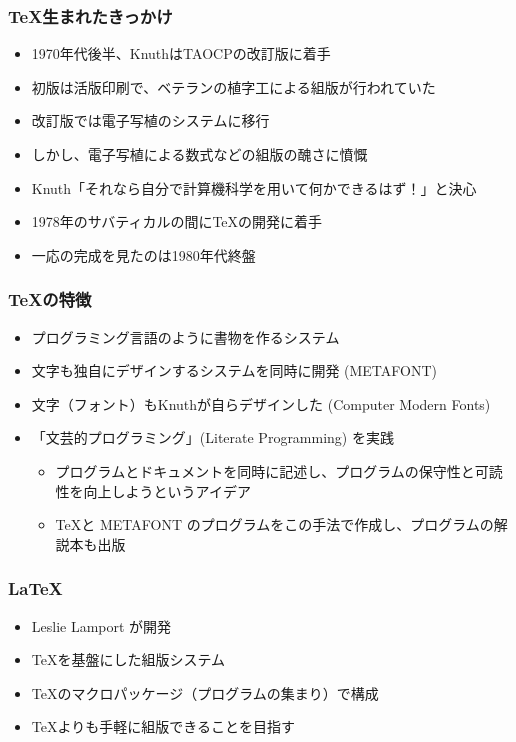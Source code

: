 \documentclass[dvipdfmx]{beamer}
\begin{document}
\begin{frame}
    \frametitle{\TeX 生まれたきっかけ \cite{tex-wikipedia}}
    \large
    \begin{itemize}
        \item<1-> 1970年代後半、KnuthはTAOCPの改訂版に着手
        \item<2-> 初版は活版印刷で、ベテランの植字工による組版が行われていた
        \item<3-> 改訂版では電子写植のシステムに移行
        \item<4-> しかし、電子写植による数式などの組版の醜さに憤慨
        \item<5-> Knuth「それなら自分で計算機科学を用いて何かできるはず！」と決心
        \item<6-> 1978年のサバティカルの間に\TeX の開発に着手
        \item<7-> 一応の完成を見たのは1980年代終盤
    \end{itemize}
\end{frame}

\begin{frame}
    \frametitle{\TeX の特徴}
    \large
    \begin{itemize}
        \item プログラミング言語のように書物を作るシステム
        \item 文字も独自にデザインするシステムを同時に開発 (METAFONT)
        \item 文字（フォント）もKnuthが自らデザインした (Computer Modern Fonts)
        \item 「文芸的プログラミング」(Literate Programming) を実践
        \begin{itemize}
            \item プログラムとドキュメントを同時に記述し、プログラムの保守性と可読性を向上しようというアイデア
            \item \TeX と METAFONT のプログラムをこの手法で作成し、プログラムの解説本も出版
        \end{itemize}
    \end{itemize}
\end{frame}

\begin{frame}
    \frametitle{\LaTeX}
    \large
    \begin{itemize}
        \item Leslie Lamport が開発
        \item \TeX を基盤にした組版システム
        \item \TeX のマクロパッケージ（プログラムの集まり）で構成
        \item \TeX よりも手軽に組版できることを目指す
    \end{itemize}
\end{frame}
\end{document}
